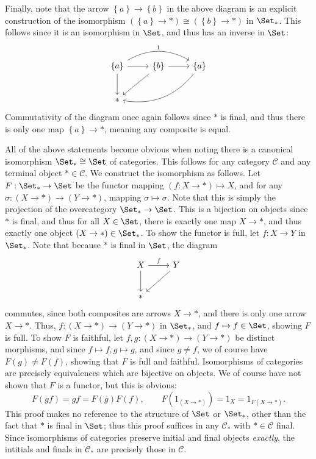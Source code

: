 \documentclass[11pt, letterpaper]{article}
\begin{document}
\begin{enumerate}
		Finally, note that the arrow $\left\{ a \right\} \to \left\{ b \right\} $ in the above diagram is an explicit construction of the isomorphism $(\left\{ a \right\} \to *)\cong (\left\{ b \right\} \to *)$ in $\Set _*$. This follows since it is an isomorphism in $\Set $, and thus has an inverse in $\Set $:
		\[\begin{tikzcd}[row sep = 2.5em, column sep = 2.5em]
		\left\{ a \right\} \ar[r] \ar[" 1 ", bend left, rr]  \ar[d] & \left\{ b \right\} \ar[r] \ar[dl]  & \left\{ a \right\} \ar[bend left, dll]  \\
		* &  & 
		\end{tikzcd}\]
		Commutativity of the diagram once again follows since $*$ is final, and thus there is only one map $\left\{ a \right\} \to *$, meaning any composite is equal.

		All of the above statements become obvious when noting there is a canonical isomorphism $\Set _* \cong \Set $ of categories. This follows for any category $\mathcal{C} $ and any terminal object $*\in \mathcal{C} $. We construct the isomorphism as follows. Let $F : \Set _* \to \Set $ be the functor mapping $(f : X \to *)\mapsto X$, and for any $\sigma : (X\to *) \to (Y\to *)$, mapping $\sigma \mapsto \sigma $. Note that this is simply the projection of the overcategory $\Set _*\to \Set $. This is a bijection on objects since $*$ is final, and thus for all $X\in \Set $, there is exactly one map $X\to *$, and thus exactly one object $(X\to *)\in \Set _*$. To show the functor is full, let $f : X \to Y$ in $\Set _*$. Note that because $*$ is final in $\Set $, the diagram
		\[\begin{tikzcd}[row sep = 2.5em, column sep = 2.5em]
		X\ar[" f ", r] \ar[d]  & Y\ar[dl]  \\
		* & 
		\end{tikzcd}\]
		commutes, since both composites are arrows $X\to *$, and there is only one arrow $X\to *$. Thus, $f : (X\to *) \to (Y\to *)$ in $\Set _*$, and $f\mapsto f\in \Set $, showing $F$ is full. To show $F$ is faithful, let $f,g : (X\to *) \to (Y\to *)$ be distinct morphisms, and since $f\mapsto f ,g\mapsto g$, and since $g\neq f$, we of course have $F(g)\neq F(f)$, showing that $F$ is full and faithful. Isomorphisms of categories are precisely equivalences which are bijective on objects. We of course have not shown that $F$ is a functor, but this is obvious:
		\[
			F(gf)=gf=F(g)F(f),\qquad F(1_{(X\to *)} )=1_X=1_{F(X\to *)} 
		.\]
		This proof makes no reference to the structure of $\Set $ or $\Set _*$, other than the fact that $*$ is final in $\Set $; thus this proof suffices in any $\mathcal{C} _*$ with $*\in \mathcal{C} $ final. Since isomorphisms of categories preserve initial and final objects \emph{exactly}, the intitials and finals in $\mathcal{C} _*$ are precisely those in $\mathcal{C} $.

\end{enumerate}
\end{document}
